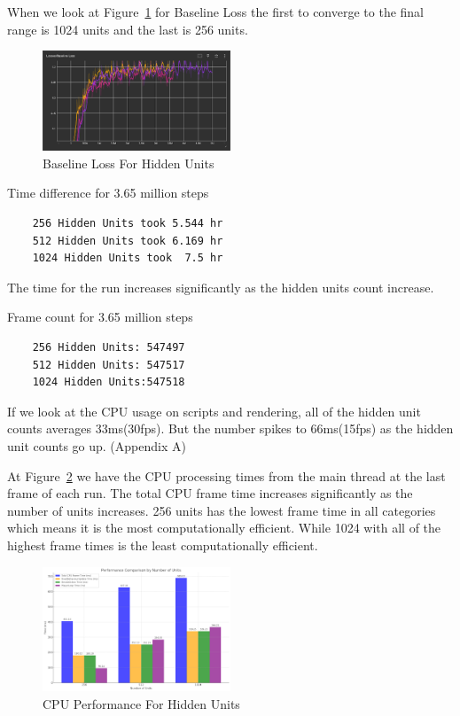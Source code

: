 \documentclass{LSkill}
\begin{document}
When we look at Figure~\ref{fig:Baseline Loss For Hidden Units} for Baseline Loss the first to converge to the final range is 1024 units and the last is 256 units.

\vspace{0.5cm}
\begin{figure}[htbp]
    \centering
    \includegraphics[width=0.5\textwidth]{figure 9.png} 
    \caption{Baseline Loss For Hidden Units}
    \label{fig:Baseline Loss For Hidden Units}
\end{figure}

Time difference for 3.65 million steps

\begin{verbatim}
    256 Hidden Units took 5.544 hr		
    512 Hidden Units took 6.169 hr
    1024 Hidden Units took  7.5 hr
\end{verbatim}

The time for the run increases significantly as the hidden units count increase.

Frame count for 3.65 million steps
\begin{verbatim}
    256 Hidden Units: 547497		
    512 Hidden Units: 547517
    1024 Hidden Units:547518
\end{verbatim}

If we look at the CPU usage on scripts and rendering, all of the hidden unit counts averages 33ms(30fps). But the number spikes to 66ms(15fps)  as the hidden unit counts go up. 
(Appendix A)

\vspace{0.5cm}

At Figure~\ref{fig:CPU Performance For Hidden Units} we have the CPU processing times from the main thread at the last frame of each run. The total CPU frame time increases significantly as the number of units increases. 256 units has the lowest frame time in all categories which means it is the most computationally efficient. While 1024 with all of the highest frame times is the least computationally efficient.


\begin{figure}[htbp]
    \centering
    \includegraphics[width=0.5\textwidth]{figure 10.png} 
    \caption{CPU Performance For Hidden Units}
    \label{fig:CPU Performance For Hidden Units}
\end{figure}
\end{document}
